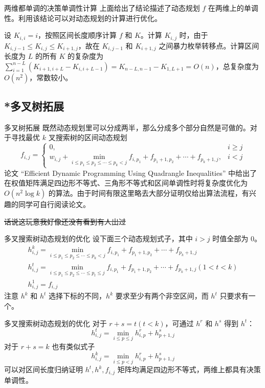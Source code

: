 \documentclass{beamer}
\begin{document}
\begin{frame}{两维都单调的决策单调性计算}
	上面给出了结论描述了动态规划 $f$ 在两维上的单调性。利用该结论可以对动态规划的计算进行优化。
	
	设 $K_{i,i} = i$，按照区间长度顺序计算 $f$ 和 $K$。计算 $K_{i,j}$ 时，由于 $K_{i,j-1} \leq K_{i,j} \leq K_{i+1,j}$，故在 $K_{i,j-1}$ 和 $K_{i+1,j}$ 之间暴力枚举转移点。计算区间长度为 $L$ 的所有 $K$ 的复杂度为 $\sum_{i=1}^{n-L}(K_{i+1,i+L}-K_{i,i+L-1}) = K_{n-L,n-1} - K_{1,L+1} = O(n)$，总复杂度为 $O(n^2)$，常数较小。
\end{frame}
\subsection{*多叉树拓展}
\begin{frame}{多叉树拓展}
既然动态规划里可以分成两半，那么分成多个部分自然是可做的。对于寻找最优 $k$ 叉搜索树的区间动态规划 $$f_{i,j} = \begin{cases}
	0, & i \geq j\\
	w_{i,j}+\min_{i \leq p_1 \leq p_2 \leq \cdots \leq p_k < j} f_{i,p_1}+f_{p_1+1,p_2}+\cdots+f_{p_k+1,j}, &i<j
\end{cases}$$
论文 “Efficient Dynamic Programming Using Quadrangle Inequalities” 中给出了在权值矩阵满足四边形不等式、三角形不等式和区间单调性时将复杂度优化为 $O(n^2 \log k)$ 的算法。由于时间有限这里略去大部分证明仅给出算法流程，有兴趣的同学可自行阅读论文。

\sout{话说这玩意我好像还没有看到有人出过}
\end{frame}
\begin{frame}{多叉搜索树动态规划的优化}
	设下面三个动态规划式子，其中 $i>j$ 时值全部为 0。
	\begin{gather*}
	h^k_{i,j}=\min_{i \leq p_1 \leq p_2 \leq \cdots \leq p_k < j} f_{i,p_1}+f_{p_1+1,p_2}+\cdots+f_{p_k+1,j}\\
	h^{t}_{i,j} = \min_{i \leq p_1 \leq p_2 \leq \cdots \leq p_t \leq j} f_{i,p_1}+f_{p_1+1,p_2}+\cdots+f_{p_k+1,j}(1 < t < k) \\
	h^{1}_{i,j}=f_{i,j}
	\end{gather*}
	注意 $h^k$ 和 $h^t$ 选择下标的不同，$h^k$ 要求至少有两个非空区间，而 $h^t$ 只要求有一个。
\end{frame}
\begin{frame}{多叉搜索树动态规划的优化}
	对于 $r+s=t(t<k)$，可通过 $h^r$ 和 $h^s$ 得到 $h^t$：$$h^t_{i,j}=\min_{i\leq p\leq j}h^r_{i,p}+h^s_{p+1,j}$$ 对于 $r+s=k$ 也有类似式子 $$h^k_{i,j}=\min_{i\leq p< j}h^r_{i,p}+h^s_{p+1,j}$$
	可以对区间长度归纳证明 $h^t,h^k,f_{i,j}$ 矩阵均满足四边形不等式，两维上都具有决策单调性。
\end{frame}
\end{document}

